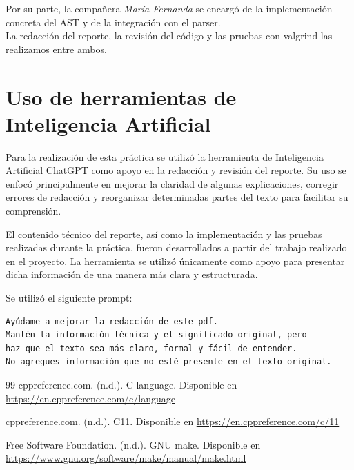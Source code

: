 \documentclass[12pt,letterpaper]{article}
\begin{document}
Por su parte, la compañera \textit{María Fernanda} se encargó de la implementación concreta del AST y de la
integración con el parser. \\

La redacción del reporte, la revisión del código y las pruebas con valgrind las realizamos entre ambos.

\section*{Uso de herramientas de Inteligencia Artificial}

Para la realización de esta práctica se utilizó la herramienta de Inteligencia Artificial ChatGPT como apoyo en la redacción y revisión del reporte. Su uso se enfocó principalmente en mejorar la claridad de algunas explicaciones, corregir errores de redacción y reorganizar determinadas partes del texto para facilitar su comprensión.

El contenido técnico del reporte, así como la implementación y las pruebas realizadas durante la práctica, fueron desarrollados a partir del trabajo realizado en el proyecto. La herramienta se utilizó únicamente como apoyo para presentar dicha información de una manera más clara y estructurada.

Se utilizó el siguiente prompt:

\begin{verbatim}
Ayúdame a mejorar la redacción de este pdf.
Mantén la información técnica y el significado original, pero
haz que el texto sea más claro, formal y fácil de entender.
No agregues información que no esté presente en el texto original.
\end{verbatim}


\begin{thebibliography}{99}
  cppreference.com. (n.d.). C language. Disponible en
  \textcolor{links}{\uline{\url{https://en.cppreference.com/c/language}}}

  cppreference.com. (n.d.). C11. Disponible en
  \textcolor{links}{\uline{\url{https://en.cppreference.com/c/11}}}

  Free Software Foundation. (n.d.). GNU make. Disponible en
  \textcolor{links}{\uline{\url{https://www.gnu.org/software/make/manual/make.html}}}
\end{thebibliography}
\end{document}
